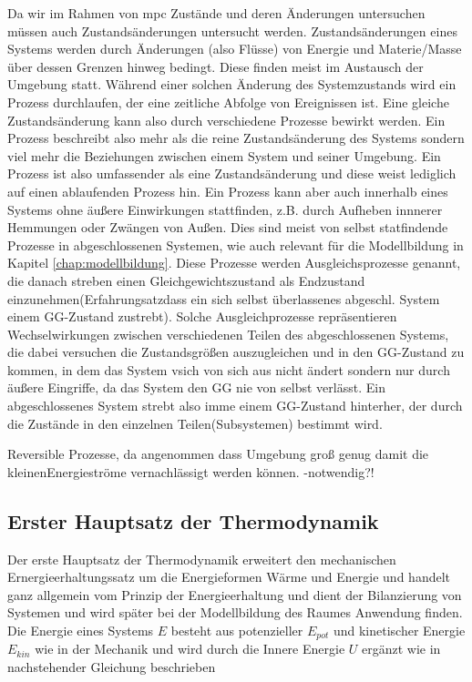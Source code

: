 Da wir im Rahmen von \acrlong{mpc} Zustände und deren Änderungen untersuchen müssen auch Zustandsänderungen untersucht werden. Zustandsänderungen eines Systems werden durch Änderungen (also Flüsse) von Energie und Materie/Masse über dessen Grenzen hinweg bedingt. Diese finden meist im Austausch der Umgebung statt. Während einer solchen Änderung des Systemzustands wird ein Prozess durchlaufen, der eine zeitliche Abfolge von Ereignissen ist. Eine gleiche Zustandsänderung kann also durch verschiedene Prozesse bewirkt werden. Ein Prozess beschreibt also mehr als die reine Zustandsänderung des Systems sondern viel mehr die Beziehungen zwischen einem System und seiner Umgebung. 
Ein Prozess ist also umfassender als eine Zustandsänderung und diese weist lediglich auf einen ablaufenden Prozess hin.
Ein Prozess kann aber auch innerhalb eines Systems ohne äußere Einwirkungen stattfinden, z.B. durch Aufheben innnerer Hemmungen oder Zwängen von Außen. Dies sind meist von selbst statfindende Prozesse in abgeschlossenen Systemen, wie auch relevant für die Modellbildung in Kapitel \ref{chap:modellbildung}. Diese Prozesse werden Ausgleichsprozesse genannt, die danach streben einen Gleichgewichtszustand als Endzustand einzunehmen(\Gun Erfahrungsatz\Gob dass ein sich selbst überlassenes abgeschl. System einem GG-Zustand zustrebt). Solche Ausgleichprozesse repräsentieren Wechselwirkungen zwischen verschiedenen Teilen des abgeschlossenen Systems, die dabei versuchen die Zustandsgrößen auszugleichen und in den GG-Zustand zu kommen, in dem das System vsich von sich aus nicht ändert sondern nur durch äußere Eingriffe, da das System den GG nie von selbst verlässt. Ein abgeschlossenes System strebt also imme einem GG-Zustand hinterher, der durch die Zustände in den einzelnen Teilen(Subsystemen) bestimmt wird. 
\cite[S.21~f.]{ba12}

Reversible Prozesse, da angenommen dass Umgebung groß genug damit die \Gun kleinen\Gob Energieströme vernachlässigt werden können. -notwendig?!


\subsection{Erster Hauptsatz der Thermodynamik}

\cite[S.~43ff.]{ba12}
Der erste Hauptsatz der Thermodynamik erweitert den mechanischen Ernergieerhaltungssatz um die Energieformen Wärme und Energie und handelt ganz allgemein vom Prinzip der Energieerhaltung und dient der Bilanzierung von Systemen und wird später bei der Modellbildung des Raumes Anwendung finden. 
Die Energie eines Systems $E$ besteht aus potenzieller $E_{pot}$ und kinetischer Energie $E_{kin}$ wie in der Mechanik und wird durch die Innere Energie $U$ ergänzt wie in nachstehender Gleichung beschrieben \cite[S.~49]{ba12}

